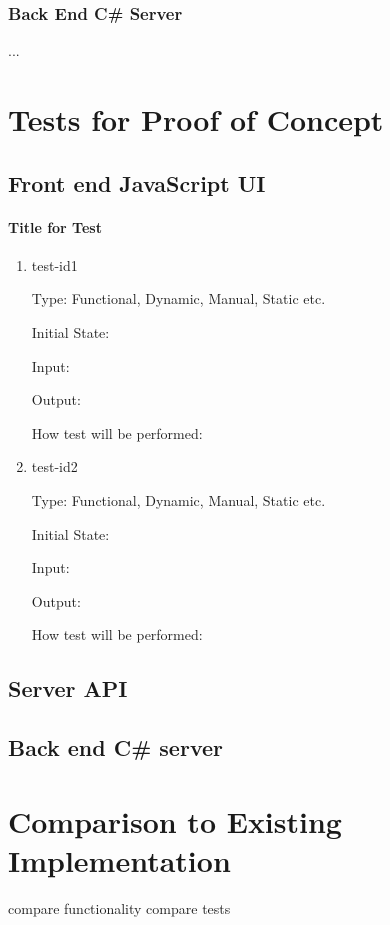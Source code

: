 \documentclass[12pt, titlepage]{article}
\begin{document}
\subsubsection{Back End C\# Server}

...


\section{Tests for Proof of Concept}

\subsection{Front end JavaScript UI}
		
\paragraph{Title for Test}

\begin{enumerate}

\item{test-id1\\}

Type: Functional, Dynamic, Manual, Static etc.
					
Initial State: 
					
Input: 
					
Output: 
					
How test will be performed: 
					
\item{test-id2\\}

Type: Functional, Dynamic, Manual, Static etc.
					
Initial State: 
					
Input: 
					
Output: 
					
How test will be performed: 

\end{enumerate}

\subsection{Server API}

\subsection{Back end C\# server}

	
\section{Comparison to Existing Implementation}	
compare functionality
compare tests
\end{document}
